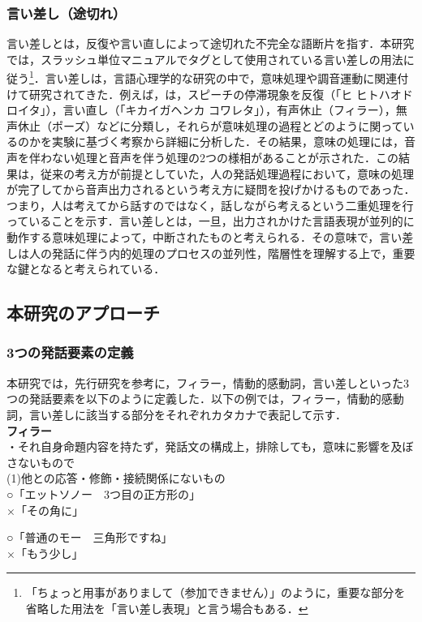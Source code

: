 \documentclass[japanese]{jnlp_1.3a}
\begin{document}
\subsubsection{言い差し（途切れ）}
言い差しとは，反復や言い直しによって途切れた不完全な語断片を指す．本研究では，スラッシュ単位マニュアルでタグとして使用されている言い差しの用法に従う\footnote{「ちょっと用事がありまして（参加できません）」のように，重要な部分を省略した用法を「言い差し表現」と言う場合もある．}．言い差しは，言語心理学的な研究の中で，意味処理や調音運動に関連付けて研究されてきた．例えば，は，スピーチの停滞現象を反復（「ヒ ヒトハオドロイタ」），言い直し（「キカイガヘンカ コワレタ」），有声休止（フィラー），無声休止（ポーズ）などに分類し，それらが意味処理の過程とどのように関っているのかを実験に基づく考察から詳細に分析した．その結果，意味の処理には，音声を伴わない処理と音声を伴う処理の2つの様相があることが示された．この結果は，従来の考え方が前提としていた，人の発話処理過程において，意味の処理が完了してから音声出力されるという考え方に疑問を投げかけるものであった．つまり，人は考えてから話すのではなく，話しながら考えるという二重処理を行っていることを示す．言い差しとは，一旦，出力されかけた言語表現が並列的に動作する意味処理によって，中断されたものと考えられる．その意味で，言い差しは人の発話に伴う内的処理のプロセスの並列性，階層性を理解する上で，重要な鍵となると考えられている．

\subsection{本研究のアプローチ}
\subsubsection{3つの発話要素の定義}
本研究では，先行研究\cite{山根}を参考に，フィラー，情動的感動詞，言い差しといった3つの発話要素を以下のように定義した．以下の例では，フィラー，情動的感動詞，言い差しに該当する部分をそれぞれカタカナで表記して示す．
\\

\noindent\textbf{フィラー}\\
・それ自身命題内容を持たず，発話文の構成上，排除しても，意味に影響を及ぼさないもので\\
\noindent (1)他との応答・修飾・接続関係にないもの\\
○「エットソノー　3つ目の正方形の」\\
×「その角に」

\noindent ○「普通のモー　三角形ですね」\\
×「もう少し」
\end{document}
